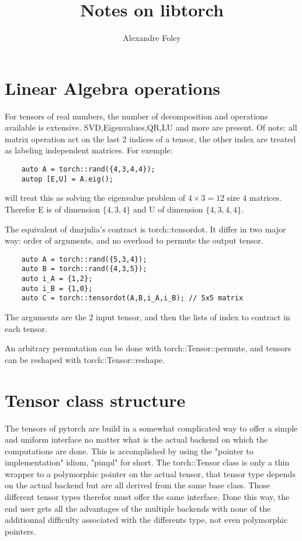 \documentclass[15pt]{article}
\begin{document}
\title{Notes on libtorch}
\author{Alexandre Foley}

\maketitle

\tableofcontents
\section{Linear Algebra operations}
For tensors of real numbers, the number of decomposition and operations available is extensive. SVD,Eigenvalues,QR,LU and more are present. Of note: all matrix operation act on the last 2 indices of a tensor, the other index are treated as labeling independent matrices. For exemple:
\begin{verbatim}
    auto A = torch::rand({4,3,4,4});
    autop [E,U] = A.eig();
\end{verbatim}
will treat this as solving the eigenvalue problem of $4\times3=12$ size $4$ matrices. Therefor E is of dimension $\{4,3,4\}$ and U of dimension $\{ 4,3,4,4\}$.

The equivalent of dmrjulia's contract is torch::tensordot. It differ in two major way: order of arguments, and no overload to permute the output tensor.
\begin{verbatim}
    auto A = torch::rand({5,3,4});
    auto B = torch::rand({4,3,5});
    auto i_A = {1,2};
    auto i_B = {1,0};
    auto C = torch::tensordot(A,B,i_A,i_B); // 5x5 matrix
\end{verbatim}
The arguments are the 2 input tensor, and then the lists of index to contract in each tensor.

An arbitrary permutation can be done with torch::Tensor::permute, and tensors can be reshaped with torch::Tensor::reshape.

\section{Tensor class structure}

The tensors of pytorch are build in a somewhat complicated way to offer a simple and uniform interface no matter what is the actual backend on which the computations are done.
This is accomplished by using the "pointer to implementation" idiom, "pimpl" for short. The torch::Tensor class is only a thin wrapper to a polymorphic pointer on the actual tensor, that tensor type depends on the actual backend but are all derived from the same base class. Those different tensor types therefor must offer the same interface.
Done this way, the end user gets all the advantages of the multiple backends with none of the additionnal difficulty associated with the differents type, not even polymorphic pointers.
\end{document}
